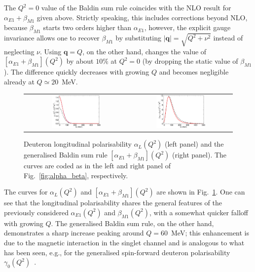 \documentclass[prl,
twocolumn,
showpacs,preprintnumbers,amsmath,amssymb,
superscriptaddress,
a4paper,nofootinbib,longbibliography]{revtex4-2}
\def\bv#1{\boldsymbol{#1}}
\begin{document}
The $Q^2=0$ value of the Baldin sum rule coincides with the NLO result for $\alpha_{E1}+\beta_{M1}$ given above. Strictly speaking, this includes corrections beyond NLO, because $\beta_{M1}$ starts two orders higher than $\alpha_{E1}$, however, the explicit gauge invariance allows one to recover $\beta_{M1}$ by substituting $|\bv{q}|=\sqrt{Q^2+\nu^2}$ instead of neglecting $\nu$. Using $\bv{q}=Q$, on the other hand, changes the value of $[\alpha_{E1}+\beta_{M1}](Q^2)$ by about $10\%$ at $Q^2=0$ (by dropping the static value of $\beta_{M1}$). The difference quickly decreases with growing $Q$ and becomes negligible already at $Q\simeq 20$~MeV.
\begin{figure}[htb]
    \centering
    \begin{tabular}{cc}
    \includegraphics[width=0.5\textwidth]{figs/alphaL.pdf} &
    \includegraphics[width=0.5\textwidth]{figs/BSR.pdf}
    \end{tabular}
    \caption{Deuteron longitudinal polarisability $\alpha_{L}(Q^2)$ (left panel) and the generalised Baldin sum rule $[\alpha_{E1}+\beta_{M1}](Q^2)$ (right panel). The curves are coded as in the left and right panel of Fig.~\ref{fig:alpha_beta}, respectively.}
    \label{fig:alphaL_BSR}
\end{figure}

The curves for $\alpha_L(Q^2)$ and $[\alpha_{E1}+\beta_{M1}](Q^2)$ are shown in Fig.~\ref{fig:alphaL_BSR}. One can see that the longitudinal polarisability shares the general features of the previously considered $\alpha_{E1}(Q^2)$ and $\beta_{M1}(Q^2)$, with a somewhat quicker falloff with growing $Q$. The generalised Baldin sum rule, on the other hand, demonstrates a sharp increase peaking around $Q=60$~MeV; this enhancement is due to the magnetic interaction in the singlet channel and is analogous to what has been seen, e.g., for the generalised spin-forward deuteron polarisability $\gamma_0(Q^2)$~\cite{Lensky:2018vdq}.
\end{document}
